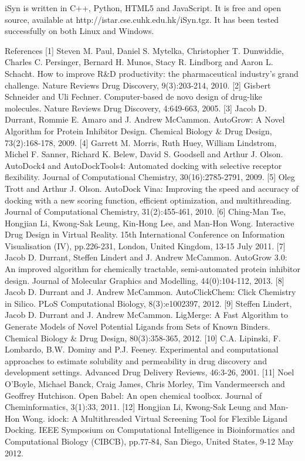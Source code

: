 iSyn is written in C++, Python, HTML5 and JavaScript. It is free and open source, available at http://istar.cse.cuhk.edu.hk/iSyn.tgz. It has been tested successfully on both Linux and Windows.


References
[1] 	Steven M. Paul, Daniel S. Mytelka, Christopher T. Dunwiddie, Charles C. Persinger, Bernard H. Munos, Stacy R. Lindborg and Aaron L. Schacht. How to improve R\&D productivity: the pharmaceutical industry's grand challenge. Nature Reviews Drug Discovery, 9(3):203-214, 2010.
[2] 	Gisbert Schneider and Uli Fechner. Computer-based de novo design of drug-like molecules. Nature Reviews Drug Discovery, 4:649-663, 2005.
[3] 	Jacob D. Durrant, Rommie E. Amaro and J. Andrew McCammon. AutoGrow: A Novel Algorithm for Protein Inhibitor Design. Chemical Biology \& Drug Design, 73(2):168-178, 2009.
[4] 	Garrett M. Morris, Ruth Huey, William Lindstrom, Michel F. Sanner, Richard K. Belew, David S. Goodsell and Arthur J. Olson. AutoDock4 and AutoDockTools4: Automated docking with selective receptor flexibility. Journal of Computational Chemistry, 30(16):2785-2791, 2009.
[5] 	Oleg Trott and Arthur J. Olson. AutoDock Vina: Improving the speed and accuracy of docking with a new scoring function, efficient optimization, and multithreading. Journal of Computational Chemistry, 31(2):455-461, 2010.
[6] 	Ching-Man Tse, Hongjian Li, Kwong-Sak Leung, Kin-Hong Lee, and Man-Hon Wong. Interactive Drug Design in Virtual Reality. 15th International Conference on Information Visualisation (IV), pp.226-231, London, United Kingdom, 13-15 July 2011.
[7] 	Jacob D. Durrant, Steffen Lindert and J. Andrew McCammon. AutoGrow 3.0: An improved algorithm for chemically tractable, semi-automated protein inhibitor design. Journal of Molecular Graphics and Modelling, 44(0):104-112, 2013.
[8] 	Jacob D. Durrant and J. Andrew McCammon. AutoClickChem: Click Chemistry in Silico. PLoS Computational Biology, 8(3):e1002397, 2012.
[9] 	Steffen Lindert, Jacob D. Durrant and J. Andrew McCammon. LigMerge: A Fast Algorithm to Generate Models of Novel Potential Ligands from Sets of Known Binders. Chemical Biology \& Drug Design, 80(3):358-365, 2012.
[10] 	C.A. Lipinski, F. Lombardo, B.W. Dominy and P.J. Feeney. Experimental and computational approaches to estimate solubility and permeability in drug discovery and development settings. Advanced Drug Delivery Reviews, 46:3-26, 2001.
[11] 	Noel O'Boyle, Michael Banck, Craig James, Chris Morley, Tim Vandermeersch and Geoffrey Hutchison. Open Babel: An open chemical toolbox. Journal of Cheminformatics, 3(1):33, 2011.
[12] 	Hongjian Li, Kwong-Sak Leung and Man-Hon Wong. idock: A Multithreaded Virtual Screening Tool for Flexible Ligand Docking. IEEE Symposium on Computational Intelligence in Bioinformatics and Computational Biology (CIBCB), pp.77-84, San Diego, United States, 9-12 May 2012.
